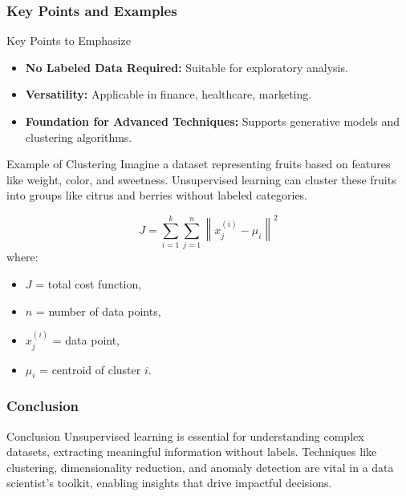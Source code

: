 \documentclass[aspectratio=169]{beamer}
\begin{document}
\begin{frame}[fragile]
    \frametitle{Key Points and Examples}
    \begin{block}{Key Points to Emphasize}
        \begin{itemize}
            \item \textbf{No Labeled Data Required:} Suitable for exploratory analysis.
            \item \textbf{Versatility:} Applicable in finance, healthcare, marketing.
            \item \textbf{Foundation for Advanced Techniques:} Supports generative models and clustering algorithms.
        \end{itemize}
    \end{block}

    \begin{block}{Example of Clustering}
        Imagine a dataset representing fruits based on features like weight, color, and sweetness. 
        Unsupervised learning can cluster these fruits into groups like citrus and berries without labeled categories.
    \end{block}

    \begin{equation}
        J = \sum_{i=1}^{k} \sum_{j=1}^{n} \left \| x_j^{(i)} - \mu_i \right \|^2
    \end{equation}
    where:
    \begin{itemize}
        \item \( J \) = total cost function,
        \item \( n \) = number of data points,
        \item \( x_j^{(i)} \) = data point,
        \item \( \mu_i \) = centroid of cluster \( i \).
    \end{itemize}
\end{frame}

\begin{frame}[fragile]
    \frametitle{Conclusion}
    \begin{block}{Conclusion}
        Unsupervised learning is essential for understanding complex datasets, extracting meaningful information without labels. 
        Techniques like clustering, dimensionality reduction, and anomaly detection are vital in a data scientist's toolkit, enabling insights that drive impactful decisions.
    \end{block}
\end{frame}
\end{document}
